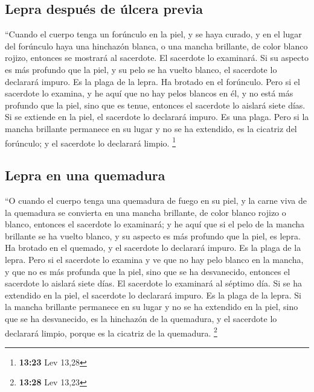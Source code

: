 \hypertarget{lepra-despuuxe9s-de-uxfalcera-previa}{%
\subsection{Lepra después de úlcera
previa}\label{lepra-despuuxe9s-de-uxfalcera-previa}}

 ``Cuando el cuerpo tenga un forúnculo en la piel, y se
haya curado,  y en el lugar del forúnculo haya una
hinchazón blanca, o una mancha brillante, de color blanco rojizo,
entonces se mostrará al sacerdote.  El sacerdote lo
examinará. Si su aspecto es más profundo que la piel, y su pelo se ha
vuelto blanco, el sacerdote lo declarará impuro. Es la plaga de la
lepra. Ha brotado en el forúnculo.  Pero si el sacerdote
lo examina, y he aquí que no hay pelos blancos en él, y no está más
profundo que la piel, sino que es tenue, entonces el sacerdote lo
aislará siete días.  Si se extiende en la piel, el
sacerdote lo declarará impuro. Es una plaga.  Pero si la
mancha brillante permanece en su lugar y no se ha extendido, es la
cicatriz del forúnculo; y el sacerdote lo declarará limpio. \footnote{\textbf{13:23}
  Lev 13,28}

\hypertarget{lepra-en-una-quemadura}{%
\subsection{Lepra en una quemadura}\label{lepra-en-una-quemadura}}

 ``O cuando el cuerpo tenga una quemadura de fuego en su
piel, y la carne viva de la quemadura se convierta en una mancha
brillante, de color blanco rojizo o blanco,  entonces el
sacerdote lo examinará; y he aquí que si el pelo de la mancha brillante
se ha vuelto blanco, y su aspecto es más profundo que la piel, es lepra.
Ha brotado en el quemado, y el sacerdote lo declarará impuro. Es la
plaga de la lepra.  Pero si el sacerdote lo examina y ve
que no hay pelo blanco en la mancha, y que no es más profunda que la
piel, sino que se ha desvanecido, entonces el sacerdote lo aislará siete
días.  El sacerdote lo examinará al séptimo día. Si se ha
extendido en la piel, el sacerdote lo declarará impuro. Es la plaga de
la lepra.  Si la mancha brillante permanece en su lugar y
no se ha extendido en la piel, sino que se ha desvanecido, es la
hinchazón de la quemadura, y el sacerdote lo declarará limpio, porque es
la cicatriz de la quemadura. \footnote{\textbf{13:28} Lev 13,23}

